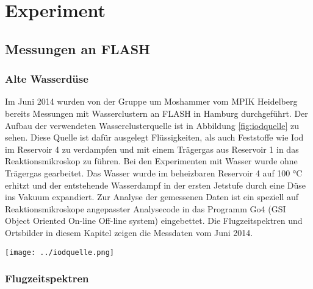 \chapter{Experiment} 
\section{Messungen an FLASH}
\subsection{Alte Wasserdüse}

Im Juni 2014 wurden von der Gruppe um Moshammer vom MPIK Heidelberg bereits Messungen mit Wasserclustern an FLASH in Hamburg durchgeführt. Der Aufbau der verwendeten Wasserclusterquelle ist in Abbildung \ref{fig:iodquelle} zu sehen. Diese Quelle ist dafür ausgelegt Flüssigkeiten, als auch Feststoffe wie Iod im Reservoir 4 zu verdampfen und mit einem Trägergas aus Reservoir 1 in das Reaktionsmikroskop zu führen. Bei den Experimenten mit Wasser wurde ohne Trägergas gearbeitet. Das Wasser wurde im beheizbaren Reservoir 4 auf 100 °C erhitzt und der entstehende Wasserdampf in der ersten Jetstufe durch eine Düse ins Vakuum expandiert.
Zur Analyse der gemessenen Daten ist ein speziell auf Reaktionsmikroskope angepasster Analysecode in das Programm Go4 (GSI Object Oriented On-line Off-line system) eingebettet. Die Flugzeitspektren und Ortsbilder in diesem Kapitel zeigen die Messdaten vom Juni 2014. 


\begin{center}
\begin{minipage}{\linewidth}
\centering
\texttt{[image: ../iodquelle.png]}%
 \label{fig:iodquelle}
\end{minipage} 
\end{center} 


\subsection{Flugzeitspektren}

